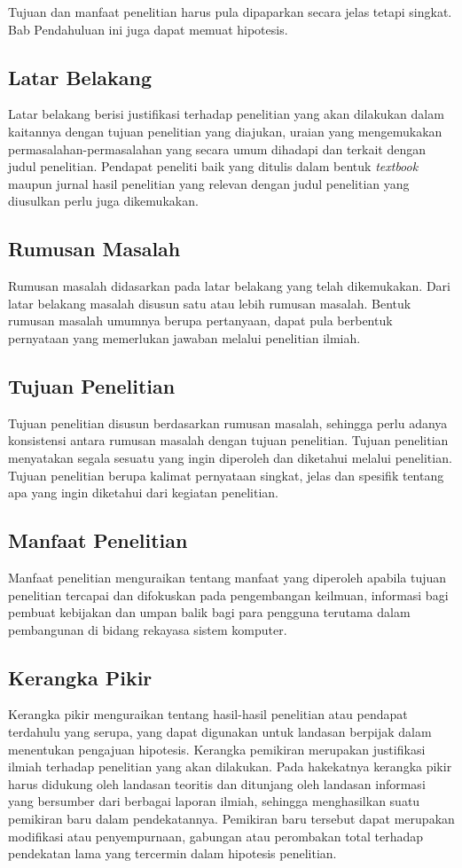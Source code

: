Tujuan dan manfaat penelitian harus pula dipaparkan secara jelas tetapi singkat. Bab Pendahuluan ini juga dapat memuat hipotesis.

\subsection{Latar Belakang}
Latar belakang berisi justifikasi terhadap penelitian yang akan dilakukan dalam kaitannya dengan tujuan penelitian yang diajukan, uraian yang mengemukakan permasalahan-permasalahan yang secara umum dihadapi dan terkait dengan judul penelitian. Pendapat peneliti baik yang ditulis dalam bentuk \textit{textbook} maupun jurnal hasil penelitian yang relevan dengan judul penelitian yang diusulkan perlu juga dikemukakan.

\subsection{Rumusan Masalah}
Rumusan masalah didasarkan pada latar belakang yang telah dikemukakan. Dari latar belakang masalah disusun satu atau lebih rumusan masalah. Bentuk rumusan masalah umumnya berupa pertanyaan, dapat pula berbentuk pernyataan yang memerlukan jawaban melalui penelitian ilmiah.

\subsection{Tujuan Penelitian}
Tujuan penelitian disusun berdasarkan rumusan masalah, sehingga perlu adanya konsistensi antara rumusan masalah dengan tujuan penelitian. Tujuan penelitian menyatakan segala sesuatu yang ingin diperoleh dan diketahui melalui penelitian. Tujuan penelitian berupa kalimat pernyataan singkat, jelas dan spesifik tentang apa yang ingin diketahui dari kegiatan penelitian.

\subsection{Manfaat Penelitian}
Manfaat penelitian menguraikan tentang manfaat yang diperoleh apabila tujuan penelitian tercapai dan difokuskan pada pengembangan keilmuan, informasi bagi pembuat kebijakan dan umpan balik bagi para pengguna terutama dalam pembangunan di bidang rekayasa sistem komputer.

\subsection{Kerangka Pikir}
Kerangka pikir menguraikan tentang hasil-hasil penelitian atau pendapat terdahulu yang serupa, yang dapat digunakan untuk landasan berpijak dalam menentukan pengajuan hipotesis. Kerangka pemikiran merupakan justifikasi ilmiah terhadap penelitian yang akan dilakukan. Pada hakekatnya kerangka pikir harus didukung oleh landasan teoritis dan ditunjang oleh landasan informasi yang bersumber dari berbagai laporan ilmiah, sehingga menghasilkan suatu pemikiran baru dalam pendekatannya. Pemikiran baru tersebut dapat merupakan modifikasi atau penyempurnaan, gabungan atau perombakan total terhadap pendekatan lama yang tercermin dalam hipotesis penelitian.

